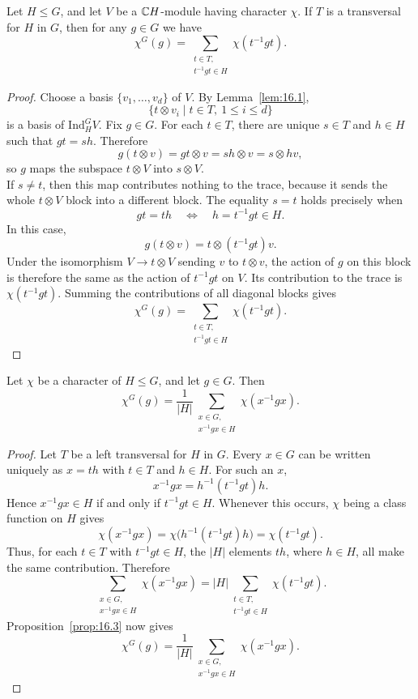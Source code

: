 \documentclass[../Odyssey_Project.tex]{subfiles}
\begin{document}
\begin{proposition}
\label{prop:16.3}
Let $H \leq G$, and let $V$ be a $\mathbb{C} H$-module having character $\chi$. If $T$ is a transversal for $H$ in $G$, then for any $g \in G$ we have
\[
\chi^G(g) = \sum_{\substack{t \in T, \\ t^{-1} g t \in H}} \chi(t^{-1} g t).
\]
\end{proposition}

\begin{proof}
    Choose a basis $\{v_1,\ldots,v_d\}$ of $V$. By Lemma~\ref{lem:16.1},
    \[
        \{t\otimes v_i\mid t\in T,\ 1\leq i\leq d\}
    \]
    is a basis of $\mathrm{Ind}_H^G V$. Fix $g\in G$. For each $t\in T$, there are unique $s\in T$ and $h\in H$ such that $gt=sh$. Therefore
    \[
        g(t\otimes v)=gt\otimes v=sh\otimes v=s\otimes hv,
    \]
    so $g$ maps the subspace $t\otimes V$ into $s\otimes V$.\\
    If $s\neq t$, then this map contributes nothing to the trace, because it sends the whole $t\otimes V$ block into a different block. The equality $s=t$ holds precisely when
    \[
        gt=th
        \quad\Longleftrightarrow\quad
        h=t^{-1}gt\in H.
    \]
    In this case,
    \[
        g(t\otimes v)=t\otimes(t^{-1}gt)v.
    \]
    Under the isomorphism $V\to t\otimes V$ sending $v$ to $t\otimes v$, the action of $g$ on this block is therefore the same as the action of $t^{-1}gt$ on $V$. Its contribution to the trace is $\chi(t^{-1}gt)$. Summing the contributions of all diagonal blocks gives
    \[
        \chi^G(g)
        =
        \sum_{\substack{t\in T,\\t^{-1}gt\in H}}
        \chi(t^{-1}gt).
    \]
\end{proof}

\begin{corollary}
\label{cor:16.4}
Let $\chi$ be a character of $H \leq G$, and let $g \in G$. Then
\[
\chi^G(g) = \frac{1}{|H|} \sum_{\substack{x \in G, \\ x^{-1} g x \in H}} \chi(x^{-1} g x).
\]
\end{corollary}

\begin{proof}
    Let $T$ be a left transversal for $H$ in $G$. Every $x\in G$ can be written uniquely as $x=th$ with $t\in T$ and $h\in H$. For such an $x$,
    \[
        x^{-1}gx=h^{-1}(t^{-1}gt)h.
    \]
    Hence $x^{-1}gx\in H$ if and only if $t^{-1}gt\in H$. Whenever this occurs, $\chi$ being a class function on $H$ gives
    \[
        \chi(x^{-1}gx)
        =
        \chi\bigl(h^{-1}(t^{-1}gt)h\bigr)
        =
        \chi(t^{-1}gt).
    \]
    Thus, for each $t\in T$ with $t^{-1}gt\in H$, the $|H|$ elements $th$, where $h\in H$, all make the same contribution. Therefore
    \[
        \sum_{\substack{x\in G,\\x^{-1}gx\in H}}\chi(x^{-1}gx)
        =
        |H|
        \sum_{\substack{t\in T,\\t^{-1}gt\in H}}\chi(t^{-1}gt).
    \]
    Proposition~\ref{prop:16.3} now gives
    \[
        \chi^G(g)
        =
        \frac{1}{|H|}
        \sum_{\substack{x\in G,\\x^{-1}gx\in H}}\chi(x^{-1}gx).
    \]
\end{proof}
\end{document}
